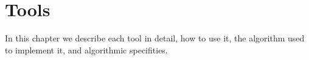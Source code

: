 \chapter{Tools}

In this chapter we describe each tool in detail, how to use it, the
algorithm used to implement it, and algorithmic specifities.



